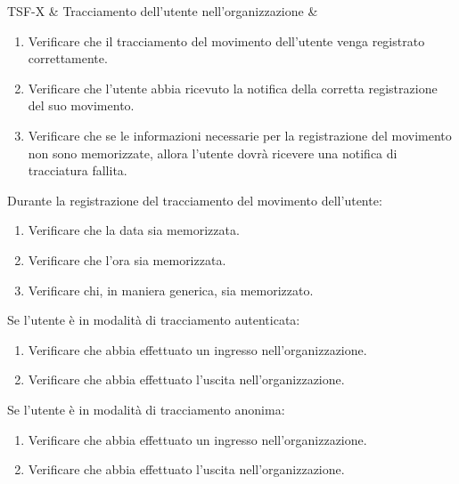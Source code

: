 TSF-X & Tracciamento dell'utente nell'organizzazione & \begin{enumerate}
    \item Verificare che il tracciamento del movimento dell'utente venga registrato correttamente.
    \item Verificare che l'utente abbia ricevuto la notifica della corretta registrazione del suo movimento.
    \item Verificare che se le informazioni necessarie per la registrazione del movimento non sono memorizzate, allora l'utente dovrà ricevere una notifica di tracciatura fallita.
\end{enumerate}
Durante la registrazione del tracciamento del movimento dell'utente:
\begin{enumerate}
    \item Verificare che la data sia memorizzata.
    \item Verificare che l'ora sia memorizzata.
    \item Verificare chi, in maniera generica, sia memorizzato.
\end{enumerate}
Se l'utente è in modalità di tracciamento autenticata:
\begin{enumerate}
    \item Verificare che abbia effettuato un ingresso nell'organizzazione.
    \item Verificare che abbia effettuato l'uscita nell'organizzazione.
\end{enumerate}
Se l'utente è in modalità di tracciamento anonima:
\begin{enumerate}
    \item Verificare che abbia effettuato un ingresso nell'organizzazione.
    \item Verificare che abbia effettuato l'uscita nell'organizzazione.
\end{enumerate} \\

